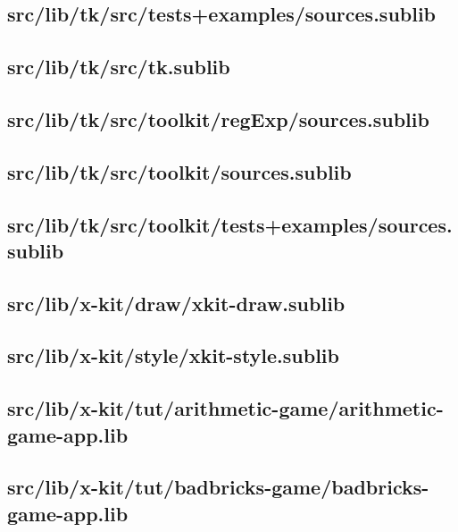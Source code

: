 \subsection{src/lib/tk/src/tests+examples/sources.sublib}


\subsection{src/lib/tk/src/tk.sublib}


\subsection{src/lib/tk/src/toolkit/regExp/sources.sublib}


\subsection{src/lib/tk/src/toolkit/sources.sublib}


\subsection{src/lib/tk/src/toolkit/tests+examples/sources.sublib}


\subsection{src/lib/x-kit/draw/xkit-draw.sublib}


\subsection{src/lib/x-kit/style/xkit-style.sublib}


\subsection{src/lib/x-kit/tut/arithmetic-game/arithmetic-game-app.lib}


\subsection{src/lib/x-kit/tut/badbricks-game/badbricks-game-app.lib}


